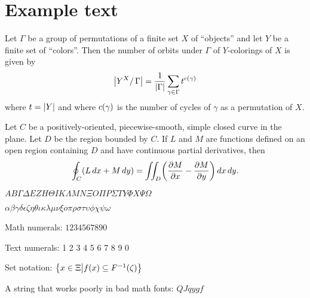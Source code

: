 \section*{Example text}

\begin{theorem*}
  Let $\Gamma$ be a group of permutations of a finite set $X$ of ``objects'' and let $Y$ be a finite set of ``colors''.
  Then the number of orbits under $\Gamma$ of $Y$-colorings of $X$ is given by
  \begin{equation*}
    \abs*{Y^{X} / \, \Gamma} = \frac{1}{\abs{\Gamma}} \sum_{\gamma \in \Gamma} t^{c \pbrac{\gamma}}
  \end{equation*}
  where $t = \abs{Y}$ and where $c \pbrac{\gamma}$ is the number of cycles of $\gamma$ as a permutation of $X$.
\end{theorem*}

\begin{theorem*}
  Let $C$ be a positively-oriented, piecewise-smooth, simple closed curve in the plane.
  Let $D$ be the region bounded by $C$.
  If $L$ and $M$ are functions defined on an open region containing $D$ and have continuous partial derivatives, then
  \begin{equation*}
    \oint_{C} \pbrac*{L \, d x + M \, d y} = \iint_{D} \pbrac*{\frac{\partial M}{\partial x} - \frac{\partial M}{\partial y}} \, dx \, d y.
  \end{equation*}
\end{theorem*}

$A B \Gamma \Delta E Z H \Theta I K \Lambda M N \Xi O \Pi P \Sigma T Y \Phi X \Psi \Omega$

$\alpha \beta \gamma \delta \epsilon \zeta \eta \theta \iota \kappa \lambda \mu \nu \xi o \pi \rho \sigma \tau \upsilon \phi \chi \psi \omega$

Math numerals:
$1 2 3 4 5 6 7 8 9 0$

Text numerals:
1 2 3 4 5 6 7 8 9 0

Set notation: $\cbrac*{x \in \Xi \middle\vert f(x) \subseteq F^{-1} (\zeta)}$

A string that works poorly in bad math fonts: $QJqygf$